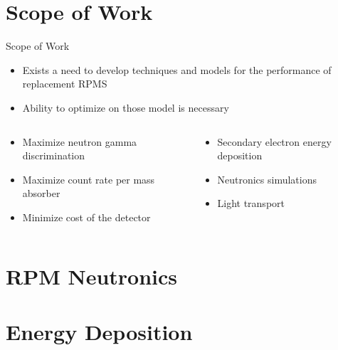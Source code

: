 \documentclass[compress]{beamer}
\begin{document}
\section{Scope of Work}
\begin{frame}{Scope of Work}
  \begin{itemize}
    \item Exists a need to develop techniques and models for the performance of replacement RPMS
    \item Ability to optimize on those model is necessary
  \end{itemize}
  \begin{columns}[onlytextwidth]
    \begin{column}{0.45\textwidth}
      \begin{itemize}
        \item Maximize neutron gamma discrimination
        \item Maximize count rate per mass absorber
        \item Minimize cost of the detector
      \end{itemize}
    \end{column}
    \begin{column}{0.45\textwidth}
      \begin{itemize}
        \item Secondary electron energy deposition
        \item Neutronics simulations
        \item Light transport 
      \end{itemize}
    \end{column}
  \end{columns}
\end{frame}

\section{RPM Neutronics}

\section{Energy Deposition}

\end{document}
